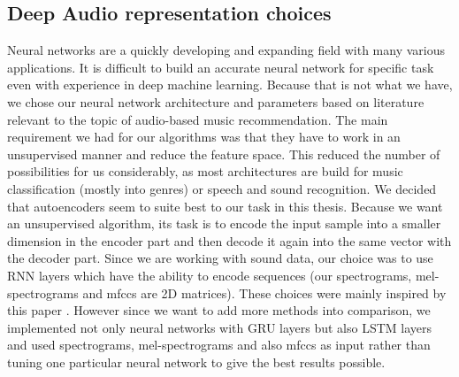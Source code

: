 \subsection{Deep Audio representation choices}
Neural networks are a quickly developing and expanding field with many various applications. It is difficult to build an accurate neural network for specific task even with experience in deep machine learning. Because that is not what we have, we chose our neural network architecture and parameters based on literature relevant to the topic of audio-based music recommendation. The main requirement we had for our algorithms was that they have to work in an unsupervised manner and reduce the feature space. This reduced the number of possibilities for us considerably, as most architectures are build for music classification (mostly into genres) or speech and sound recognition. We decided that autoencoders seem to suite best to our task in this thesis.  Because we want an unsupervised algorithm, its task is to encode the input sample into a smaller dimension in the encoder part and then decode it again into the same vector with the decoder part. Since we are working with sound data, our choice was to use RNN layers which have the ability to encode sequences (our spectrograms, mel-spectrograms and mfccs are 2D matrices). These choices were mainly inspired by this paper \cite{inproceedings_RNNs}. However since we want to add more methods into comparison, we implemented not only neural networks with GRU layers but also LSTM layers and used spectrograms, mel-spectrograms and also mfccs as input rather than tuning one particular neural network to give the best results possible. 